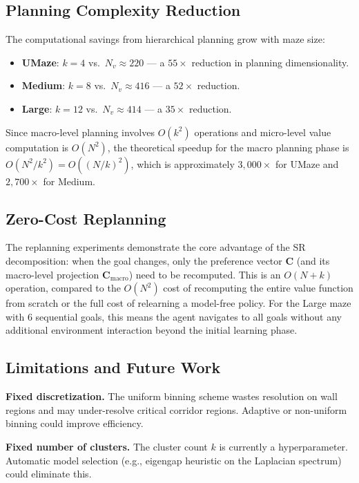 \documentclass[11pt,a4paper]{article}
\newcommand{\C}{\mathbf{C}}
\newcommand{\Cmacro}{\C_{\text{macro}}}
\begin{document}
\subsection{Planning Complexity Reduction}

The computational savings from hierarchical planning grow with maze size:
\begin{itemize}[noitemsep]
    \item \textbf{UMaze}: $k = 4$ vs.\ $N_v \approx 220$ --- a $55\times$ reduction in planning dimensionality.
    \item \textbf{Medium}: $k = 8$ vs.\ $N_v \approx 416$ --- a $52\times$ reduction.
    \item \textbf{Large}: $k = 12$ vs.\ $N_v \approx 414$ --- a $35\times$ reduction.
\end{itemize}
Since macro-level planning involves $O(k^2)$ operations and micro-level value computation is $O(N^2)$, the theoretical speedup for the macro planning phase is $O(N^2/k^2) = O((N/k)^2)$, which is approximately $3{,}000\times$ for UMaze and $2{,}700\times$ for Medium.

\subsection{Zero-Cost Replanning}

The replanning experiments demonstrate the core advantage of the SR decomposition: when the goal changes, only the preference vector $\C$ (and its macro-level projection $\Cmacro$) need to be recomputed.
This is an $O(N + k)$ operation, compared to the $O(N^2)$ cost of recomputing the entire value function from scratch or the full cost of relearning a model-free policy.
For the Large maze with 6 sequential goals, this means the agent navigates to all goals without any additional environment interaction beyond the initial learning phase.

\subsection{Limitations and Future Work}

\textbf{Fixed discretization.} The uniform binning scheme wastes resolution on wall regions and may under-resolve critical corridor regions. Adaptive or non-uniform binning could improve efficiency.

\textbf{Fixed number of clusters.} The cluster count $k$ is currently a hyperparameter. Automatic model selection (e.g., eigengap heuristic on the Laplacian spectrum) could eliminate this.
\end{document}
